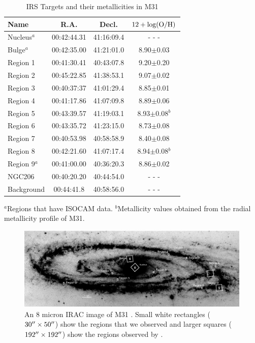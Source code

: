 \begin{table}
 \centering
 \begin{minipage}{70mm}
\caption{IRS Targets and their metallicities in M31
\label{regions}}
  \begin{tabular}{lccc}
  \hline Name & R.A. & Decl. &$12+\log({\rm O/H})$
   \\
 \hline
 Nucleus$^a$&00:42:44.31&41:16:09.4& - - -\\
Bulge$^a$&00:42:35.00&41:21:01.0&8.90$\pm$0.03\\
Region 1&00:41:30.41&40:43:07.8&9.20$\pm$0.20\\
Region 2&00:45:22.85&41:38:53.1&9.07$\pm$0.02\\
Region 3&00:40:37:37&41:01:29.4&8.85$\pm$0.01\\
Region 4&00:41:17.86&41:07:09.8&8.89$\pm$0.06\\
Region 5&00:43:39.57&41:19:03.1&\hspace{0.14cm}8.93$\pm$0.08$^b$\\
Region 6&00:43:35.72&41:23:15.0&8.73$\pm$0.08\\
Region 7&00:40:53.98&40:58:58.9&8.40$\pm$0.08\\
Region 8&00:42:21.60&41:07:17.4&\hspace{0.14cm}8.94$\pm$0.08$^b$\\
Region 9$^a$&00:41:00.00&40:36:20.3&8.86$\pm$0.02\\
NGC206&00:40:20.20&40:44:54.0& - - -\\
Background&00:44:41.8&40:58:56.0& - - -\\
\hline
\end{tabular}
{$^a$Regions that have ISOCAM data. 
$^b$Metallicity values obtained from the radial metallicity profile of M31.}
\end{minipage}
\end{table}

\begin{figure}
\centering
\includegraphics[scale=0.9]{./m31_map.eps}
\caption{An 8 micron IRAC image of M31 \citep{Barmby2006lr}. Small white rectangles ($30\hbox{$^{\prime\prime}$}\times50\hbox{$^{\prime\prime}$}$) show the regions that we observed and larger squares ($192\hbox{$^{\prime\prime}$}\times192\hbox{$^{\prime\prime}$}$) show the regions observed by  \citet{1998Cesarsky}.
\label{m31}
}
\end{figure}

